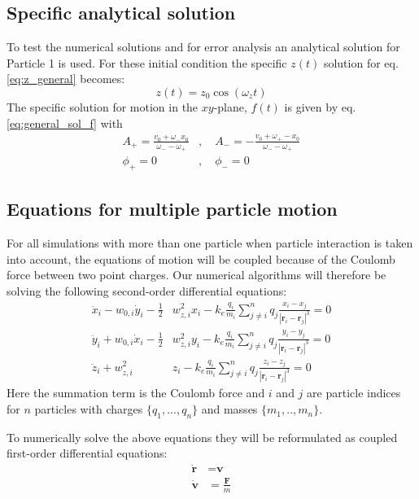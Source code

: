 \documentclass[english,notitlepage,reprint,nofootinbib]{revtex4-1}  %
\begin{document}
\subsection*{Specific analytical solution}
To test the numerical solutions and for error analysis an analytical solution for
Particle 1 is used. For these initial condition the specific $z(t)$ solution for
eq. \ref{eq:z_general} becomes:
\begin{equation*}
    z(t) = z_0 \cos(\omega_z t)
\end{equation*}
The specific solution for motion in the $xy$-plane, $f(t)$ is given by eq. \ref{eq:general_sol_f}
with
\begin{align*}
    A_+ = \frac{v_0 + \omega_- x_0}{\omega_- - \omega_+} & , \quad A_- = -\frac{v_0 + \omega_+- x_0}{\omega_- - \omega_+} \\
    \phi_+ = 0                                           & , \quad \phi_- = 0
\end{align*}


\subsection*{Equations for multiple particle motion}
For all simulations with more than one particle when particle interaction is taken into account,
the equations of motion will be coupled because of the Coulomb force between two point charges.
Our numerical algorithms will therefore be solving the following second-order differential equations:
\begin{align}
    \ddot{x}_i - w_{0,i} \dot{y}_i - \frac{1}{2} & w_{z,i}^2 x_i - k_e \frac{q_i}{m_i} \sum_{j\neq i}^{n} q_j \frac{x_i - x_j}{|\textbf{r}_i - \textbf{r}_j|^3} = 0 \label{eq:a_x_coupled} \\
    \ddot{y}_i + w_{0,i} \dot{x}_i - \frac{1}{2} & w_{z,i}^2 y_i - k_e \frac{q_i}{m_i} \sum_{j\neq i}^{n} q_j \frac{y_i - y_j}{|\textbf{r}_i - \textbf{r}_j|^3} = 0 \label{eq:a_y_coupled} \\
    \ddot{z}_i + w_{z,i}^2                       & z_i - k_e \frac{q_i}{m_i} \sum_{j\neq i}^{n} q_j \frac{z_i - z_j}{|\textbf{r}_i - \textbf{r}_j|^3} = 0 \label{eq:a_z_coupled}
\end{align}
Here the summation term is the Coulomb force and $i$ and $j$ are particle indices for $n$ particles
with charges $\{q_1,...,q_n\}$ and masses $\{m_1,..,m_n\}$.

To numerically solve the above equations they will be reformulated as coupled first-order differential equations:
\begin{align}
    \dot{\textbf{r}} & = \textbf{v} \label{eq:position} \\
    \dot{\textbf{v}} & = \frac{\textbf{F}}{m} \label{eq:velocity}
\end{align}
\end{document}

